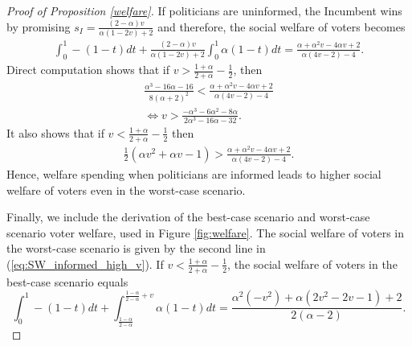 \documentclass[12pt,english]{article}
\begin{document}
\begin{proof}[Proof of Proposition \ref{welfare}]
If politicians are uninformed, the Incumbent wins by promising $s_I = \frac{(2 - \alpha ) v}{ \alpha(1 - 2 v) + 2}$
and therefore, the social welfare of voters becomes
\begin{equation*}
\begin{aligned}
\int_0^1 -(1-t)dt + \frac{(2 - \alpha ) v}{ \alpha(1 - 2 v) + 2} \int_{0}^{1} \alpha (1-t)dt = \frac{\alpha +\alpha ^2 v-4 \alpha  v+2}{\alpha  (4 v-2)-4}.
\end{aligned}
\end{equation*}
Direct computation shows that if $v > \frac{1 + \alpha }{2 + \alpha }-\frac{1}{2}$, then
\begin{equation*}
\begin{aligned}
\frac{\alpha ^3-16 \alpha -16}{8 (\alpha +2)^2} < \frac{\alpha +\alpha ^2 v-4 \alpha  v+2}{\alpha  (4 v-2)-4} \\
\Leftrightarrow v > \frac{-\alpha ^3-6 \alpha ^2-8 \alpha }{2 \alpha ^3-16 \alpha -32}. 
\end{aligned}
\end{equation*}
It also shows that if $v < \frac{1 + \alpha }{2 + \alpha }-\frac{1}{2}$ then
\begin{equation*}
\begin{aligned}
\frac{1}{2} \left(\alpha  v^2+\alpha  v-1\right) > \frac{\alpha +\alpha ^2 v-4 \alpha  v+2}{\alpha  (4 v-2)-4}.
\end{aligned}
\end{equation*}
Hence, welfare spending when politicians are informed leads to higher social welfare of voters even in the worst-case scenario. 

Finally, we include the derivation of the best-case scenario and worst-case scenario voter welfare, used in Figure \ref{fig:welfare}.
The social welfare of voters in the worst-case scenario is given by the second line in (\ref{eq:SW_informed_high_v}).
If $v < \frac{1 + \alpha}{2 + \alpha} - \frac{1}{2}$, the social welfare of voters in the best-case scenario equals
\begin{equation*}
\int_0^1 -(1-t)dt + \int_{\frac{1 - \alpha}{2 - \alpha} }^{\frac{1 - \alpha}{2 - \alpha} + v} \alpha (1-t)dt = \frac{\alpha ^2 \left(-v^2\right)+\alpha  \left(2 v^2-2 v-1\right)+2}{2 (\alpha -2)}.
\end{equation*}

\end{proof}
\end{document}

